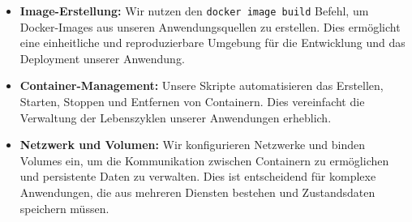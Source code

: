 \begin{itemize}
    \item \textbf{Image-Erstellung:} Wir nutzen den \texttt{docker image build} Befehl, um Docker-Images aus unseren Anwendungsquellen zu erstellen. Dies ermöglicht eine einheitliche und reproduzierbare Umgebung für die Entwicklung und das Deployment unserer Anwendung.
    \item \textbf{Container-Management:} Unsere Skripte automatisieren das Erstellen, Starten, Stoppen und Entfernen von Containern. Dies vereinfacht die Verwaltung der Lebenszyklen unserer Anwendungen erheblich.
    \item \textbf{Netzwerk und Volumen:} Wir konfigurieren Netzwerke und binden Volumes ein, um die Kommunikation zwischen Containern zu ermöglichen und persistente Daten zu verwalten. Dies ist entscheidend für komplexe Anwendungen, die aus mehreren Diensten bestehen und Zustandsdaten speichern müssen.
\end{itemize}


